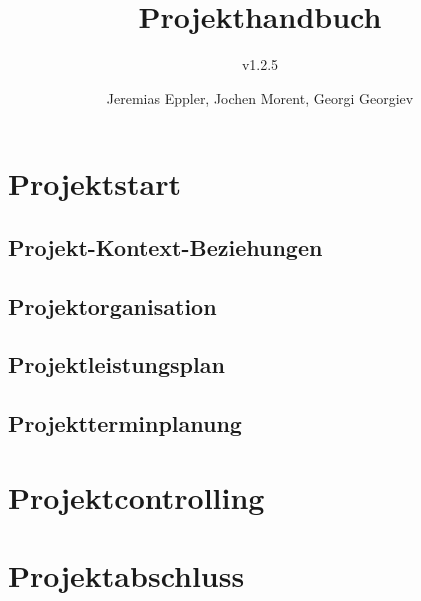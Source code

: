 \documentclass[10pt,a4paper]{scrreprt}
\title{Projekthandbuch}
\subtitle{v1.2.5}
\author{Jeremias Eppler, Jochen Morent, Georgi Georgiev}
\begin{document}
\maketitle
\newpage
\chapter{Projektstart}
	\section{Projekt-Kontext-Beziehungen}
		
		\newpage
		
		\newpage
		
	\newpage
	\section{Projektorganisation}
		
	\newpage
	\section{Projektleistungsplan}
		
		\newpage
		
	\newpage
	\section{Projektterminplanung}
		
		\newpage
		
		\newpage
		

\newpage
\chapter{Projektcontrolling}
	
	\newpage
	

\newpage
\chapter{Projektabschluss}
\end{document}
